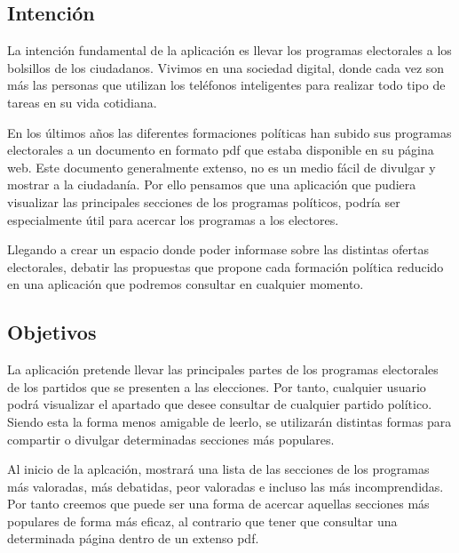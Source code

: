 	\subsection{Intención}

La intención fundamental de la aplicación es llevar los programas electorales a los bolsillos de los ciudadanos. Vivimos en una sociedad digital, donde cada vez son más las personas que utilizan los teléfonos inteligentes para realizar todo tipo de tareas en su vida cotidiana.

En los últimos años las diferentes formaciones políticas han subido sus programas electorales a un documento en formato pdf que estaba disponible en su página web. Este documento generalmente extenso, no es un medio fácil de divulgar y mostrar a la ciudadanía. Por ello pensamos que una aplicación que pudiera visualizar las principales secciones de los programas políticos, podría ser especialmente útil para acercar los programas a los electores.

Llegando a crear un espacio donde poder informase sobre las distintas ofertas electorales, debatir las propuestas que propone cada formación política reducido en una aplicación que podremos consultar en cualquier momento.
  
	\subsection{Objetivos}
	
La aplicación pretende llevar las principales partes de los programas electorales de los partidos que se presenten a las elecciones. Por tanto, cualquier usuario podrá visualizar el apartado que desee consultar de cualquier partido político. Siendo esta la forma menos amigable de leerlo, se utilizarán distintas formas para compartir o divulgar determinadas secciones más populares.

Al inicio de la aplcación, mostrará una lista de las secciones de los programas más valoradas, más debatidas, peor valoradas e incluso las más incomprendidas. Por tanto creemos que puede ser una forma de acercar aquellas secciones más populares de forma más eficaz, al contrario que tener que consultar una determinada página dentro de un extenso pdf.

